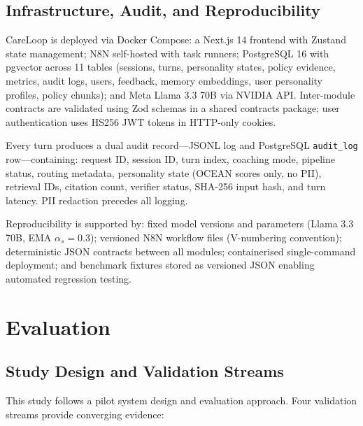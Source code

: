 \documentclass[10pt,a4paper]{report}
\begin{document}
\section{Infrastructure, Audit, and Reproducibility}

CareLoop is deployed via Docker Compose: a Next.js 14 frontend with Zustand state management; N8N self-hosted with task runners; PostgreSQL 16 with pgvector across 11 tables (sessions, turns, personality states, policy evidence, metrics, audit logs, users, feedback, memory embeddings, user personality profiles, policy chunks); and Meta Llama 3.3 70B via NVIDIA API. Inter-module contracts are validated using Zod schemas in a shared contracts package; user authentication uses HS256 JWT tokens in HTTP-only cookies.

Every turn produces a dual audit record---JSONL log and PostgreSQL \texttt{audit\_log} row---containing: request ID, session ID, turn index, coaching mode, pipeline status, routing metadata, personality state (OCEAN scores only, no PII), retrieval IDs, citation count, verifier status, SHA-256 input hash, and turn latency. PII redaction precedes all logging.

Reproducibility is supported by: fixed model versions and parameters (Llama 3.3 70B, EMA $\alpha_s = 0.3$); versioned N8N workflow files (V-numbering convention); deterministic JSON contracts between all modules; containerised single-command deployment; and benchmark fixtures stored as versioned JSON enabling automated regression testing.

\chapter{Evaluation}
\label{ch:eval}

\section{Study Design and Validation Streams}

This study follows a pilot system design and evaluation approach. Four validation streams provide converging evidence:
\end{document}
